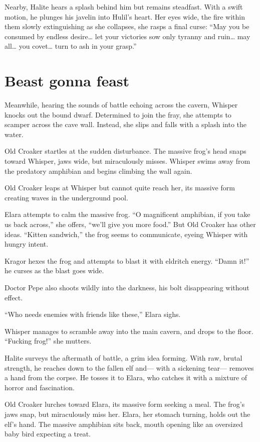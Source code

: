 \documentclass[
  letterpaper,12pt,twoside,twocolumn,openany,
  nodeprecatedcode,bg=full]{dndbook}
\begin{document}
Nearby, Halite hears a splash behind him but remains steadfast. With a
swift motion, he plunges his javelin into Hulil's heart. Her eyes wide,
the fire within them slowly extinguishing as she collapses, she rasps a
final curse: ``May you be consumed by endless desire\ldots{} let your
victories sow only tyranny and ruin\ldots{} may all\ldots{} you
covet\ldots{} turn to ash in your grasp.''

\section{Beast gonna feast}\label{beast-gonna-feast}

Meanwhile, hearing the sounds of battle echoing across the cavern,
Whisper knocks out the bound dwarf. Determined to join the fray, she
attempts to scamper across the cave wall. Instead, she slips and falls
with a splash into the water.

Old Croaker startles at the sudden disturbance. The massive frog's head
snaps toward Whisper, jaws wide, but miraculously misses. Whisper swims
away from the predatory amphibian and begins climbing the wall again.

Old Croaker leaps at Whisper but cannot quite reach her, its massive
form creating waves in the underground pool.

Elara attempts to calm the massive frog. ``O magnificent amphibian, if
you take us back across,'' she offers, ``we'll give you more food.'' But
Old Croaker has other ideas. ``Kitten sandwich,'' the frog seems to
communicate, eyeing Whisper with hungry intent.

Kragor hexes the frog and attempts to blast it with eldritch energy.
``Damn it!'' he curses as the blast goes wide.

Doctor Pepe also shoots wildly into the darkness, his bolt disappearing
without effect.

``Who needs enemies with friends like these,'' Elara sighs.

Whisper manages to scramble away into the main cavern, and drops to the
floor. ``Fucking frog!'' she mutters.

Halite surveys the aftermath of battle, a grim idea forming. With raw,
brutal strength, he reaches down to the fallen elf and--- with a
sickening tear--- removes a hand from the corpse. He tosses it to Elara,
who catches it with a mixture of horror and fascination.

Old Croaker lurches toward Elara, its massive form seeking a meal. The
frog's jaws snap, but miraculously miss her. Elara, her stomach turning,
holds out the elf's hand. The massive amphibian sits back, mouth opening
like an oversized baby bird expecting a treat.
\end{document}
